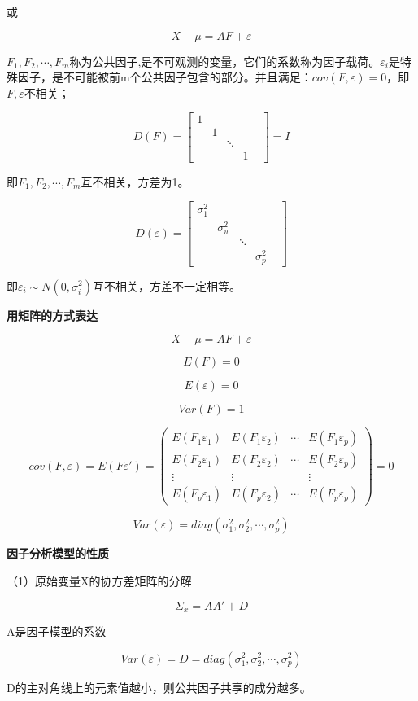\documentclass[]{ctexbook}
\begin{document}
或

\[X-\mu=AF+\varepsilon\]

\(F_1,F_2,\cdots,F_m\)称为公共因子,是不可观测的变量，它们的系数称为因子载荷。\(\varepsilon_i\)是特殊因子，是不可能被前m个公共因子包含的部分。并且满足：\(cov(F,\varepsilon)=0\)，即\(F,\varepsilon\)不相关；

\[D(F)=\begin {bmatrix} 1 & & & \\&1&&&\\&&\ddots&\\&&&1 \end {bmatrix}=I\]

即\(F_1,F_2,\cdots,F_m\)互不相关，方差为1。

\[D(\varepsilon)=\begin {bmatrix}\sigma_1^2&&&\\&\sigma_w^2&&&\\&&\ddots&\\&&&\sigma_p^2\end {bmatrix}\]

即\(\varepsilon_i\sim N(0,\sigma_i^2)\)互不相关，方差不一定相等。

\textbf{用矩阵的方式表达}

\[X-\mu=AF+\varepsilon\]

\[E(F)=0\]

\[E(\varepsilon)=0\]

\[Var(F)=1\]

\[cov(F,\varepsilon)=E(F\varepsilon')=\begin {pmatrix}E(F_1\varepsilon_1)&E(F_1\varepsilon_2)&\cdots&E(F_1\varepsilon_p)\\E(F_2\varepsilon_1)&E(F_2\varepsilon_2)&\cdots&E(F_2\varepsilon_p)\\\vdots&\vdots&&\vdots\\E(F_p\varepsilon_1)&E(F_p\varepsilon_2)&\cdots&E(F_p\varepsilon_p) \end {pmatrix}=0\]

\[Var(\varepsilon)=diag(\sigma_1^2,\sigma_2^2,\cdots,\sigma_p^2)\]

\textbf{因子分析模型的性质}

（1）原始变量X的协方差矩阵的分解

\[\Sigma_x=AA'+D\]

A是因子模型的系数

\[Var(\varepsilon)=D=diag(\sigma_1^2,\sigma_2^2,\cdots,\sigma_p^2)\]

D的主对角线上的元素值越小，则公共因子共享的成分越多。
\end{document}
